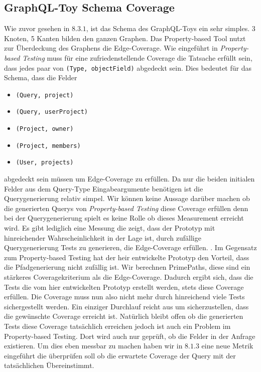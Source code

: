 \subsection{GraphQL-Toy Schema Coverage}

Wie zuvor gesehen in $8.3.1$, ist das Schema des GraphQL-Toys ein sehr simples.
3 Knoten, 5 Kanten bilden den ganzen Graphen.
Das Property-based Tool nutzt zur Überdeckung des Graphens die Edge-Coverage. \cite[vgl. Measuring Schema Coverage]{property-based-testing}
Wie eingeführt in \textit{Property-based Testing}\cite{property-based-testing} muss für eine zufriedenstellende Coverage
die Tatsache erfüllt sein, dass jedes paar von \verb+(Type, objectField)+ abgedeckt sein.
Dies bedeutet für das Schema, dass die Felder

\begin{itemize}
    \item \verb+(Query, project)+
    \item \verb+(Query, userProject)+
    \item \verb+(Project, owner)+
    \item \verb+(Project, members)+
    \item \verb+(User, projects)+
\end{itemize}

abgedeckt sein müssen um Edge-Coverage zu erfüllen.
Da nur die beiden initialen Felder aus dem Query-Type Eingabeargumente benötigen ist die Querygenerierung relativ simpel.
Wir können keine Aussage darüber machen ob die generierten Querys von \textit{Property-based Testing}\cite{property-based-testing} diese Coverage erfüllen
denn bei der Querygenerierung spielt es keine Rolle ob dieses Measurement erreicht wird.
Es gibt lediglich eine Messung die zeigt, dass der Prototyp mit hinreichender Wahrscheinlichkeit in der Lage ist, durch zufällige Querygenerierung
Tests zu generieren, die Edge-Coverage erfüllen. \cite[vgl. D.Results RQ1 ]{property-based-testing}.
Im Gegensatz zum Property-based Testing hat der heir entwickelte Prototyp den Vorteil, dass die Pfadgenerierung nicht zufällig ist.
Wir berechnen PrimePaths, diese sind ein stärkeres Coveragekriterium als die Edge-Coverage.
Dadurch ergibt sich, dass die Tests die vom hier entwickelten Prototyp erstellt werden, stets diese Coverage erfüllen.
Die Coverage muss nun also nicht mehr durch hinreichend viele Tests sichergestellt werden.
Ein einziger Durchlauf reicht aus um sicherzustellen, dass die gewünschte Coverage erreicht ist.
Natürlich bleibt offen ob die generierten Tests diese Coverage tatsächlich erreichen jedoch ist auch ein Problem im Property-based Testing.
Dort wird auch nur geprüft, ob die Felder in der Anfrage existieren.
Um dies eben messbar zu machen haben wir in $8.1.3$ eine neue Metrik eingeführt die überprüfen soll ob die erwartete Coverage der Query mit der
tatsächlichen Übereinstimmt.

